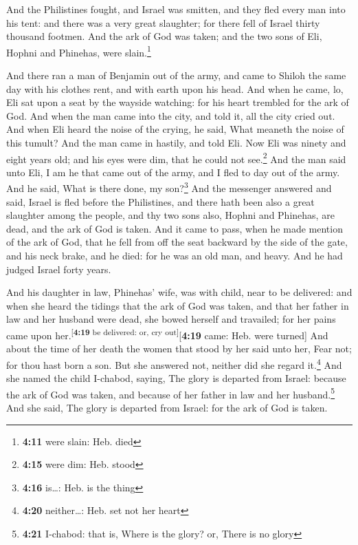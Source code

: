  And the Philistines fought, and Israel was smitten, and
they fled every man into his tent: and there was a very great slaughter;
for there fell of Israel thirty thousand footmen.  And
the ark of God was taken; and the two sons of Eli, Hophni and Phinehas,
were slain.\footnote{\textbf{4:11} were slain: Heb. died}

 And there ran a man of Benjamin out of the army, and
came to Shiloh the same day with his clothes rent, and with earth upon
his head.  And when he came, lo, Eli sat upon a seat by
the wayside watching: for his heart trembled for the ark of God. And
when the man came into the city, and told it, all the city cried out.
 And when Eli heard the noise of the crying, he said,
What meaneth the noise of this tumult? And the man came in hastily, and
told Eli.  Now Eli was ninety and eight years old; and
his eyes were dim, that he could not see.\footnote{\textbf{4:15} were
  dim: Heb. stood}  And the man said unto Eli, I am he
that came out of the army, and I fled to day out of the army. And he
said, What is there done, my son?\footnote{\textbf{4:16} is\ldots: Heb.
  is the thing}  And the messenger answered and said,
Israel is fled before the Philistines, and there hath been also a great
slaughter among the people, and thy two sons also, Hophni and Phinehas,
are dead, and the ark of God is taken.  And it came to
pass, when he made mention of the ark of God, that he fell from off the
seat backward by the side of the gate, and his neck brake, and he died:
for he was an old man, and heavy. And he had judged Israel forty years.

 And his daughter in law, Phinehas' wife, was with child,
near to be delivered: and when she heard the tidings that the ark of God
was taken, and that her father in law and her husband were dead, she
bowed herself and travailed; for her pains came upon
her.\textsuperscript{{[}\textbf{4:19} be delivered: or, cry
out{]}}{[}\textbf{4:19} came: Heb. were turned{]}  And
about the time of her death the women that stood by her said unto her,
Fear not; for thou hast born a son. But she answered not, neither did
she regard it.\footnote{\textbf{4:20} neither\ldots: Heb. set not her
  heart}  And she named the child I-chabod, saying, The
glory is departed from Israel: because the ark of God was taken, and
because of her father in law and her husband.\footnote{\textbf{4:21}
  I-chabod: that is, Where is the glory? or, There is no glory}
 And she said, The glory is departed from Israel: for the
ark of God is taken.

